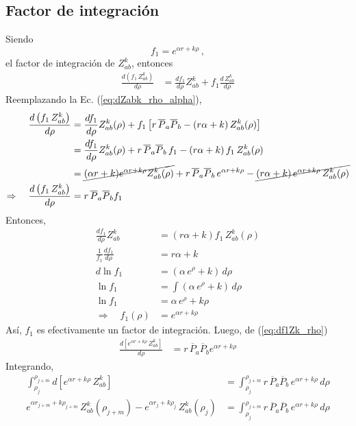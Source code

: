\documentclass[11pt]{article}
\begin{document}
\subsection{Factor de integración}
Siendo 
\begin{equation}
 f_1=e^{\alpha r+k\rho}\,,
\end{equation}
el factor de integración de $Z_{ab}^k$, entonces
\begin{align}
 \frac{d\left(f_1\,Z_{ab}^k\right)}{d\rho} 
 &=\frac{df_1}{d\rho} Z_{ab}^k + f_1 \frac{d\, Z_{ab}^k}{d\rho}
\end{align}
Reemplazando la Ec. (\ref{eq:dZabk_rho_alpha}),
\begin{align}
 \frac{d\left(f_1\,Z_{ab}^k\right)}{d\rho} 
 &=\frac{df_1}{d\rho} Z_{ab}^k(\rho) + f_1 \left[r\,\overline{P}_a\overline{P}_b - \left(r\alpha+k\right) Z_{ab}^k(\rho)\right]\\
 &=\frac{df_1}{d\rho} Z_{ab}^k(\rho) + r\,\overline{P}_a\overline{P}_b\,f_1 - \left(r\alpha+k\right)f_1\, Z_{ab}^k(\rho)\\
 &=\cancel{(\alpha r+k)e^{\alpha r+k\rho} Z_{ab}^k(\rho)} + r\,\overline{P}_a\overline{P}_b\,e^{\alpha r+k\rho} - \cancel{\left(r\alpha+k\right)e^{\alpha r+k\rho}\, Z_{ab}^k(\rho)} \\
 \Rightarrow\quad \frac{d\left(f_1\,Z_{ab}^k\right)}{d\rho} 
 &= r\,\overline{P}_a\overline{P}_b f_1 
 \label{eq:df1Zk_rho}
\end{align}
Entonces, 
\begin{align}
 \frac{df_1}{d\rho} Z_{ab}^k &= \left(r\alpha+k\right)f_1\, Z_{ab}^k(\rho) \\
 \frac{1}{f_1}\frac{df_1}{d\rho}&=r\alpha+k \\
 d \ln f_1 &=(\alpha\,e^{\rho} +k)\,d\rho \\
 \ln f_1 &=\int (\alpha\,e^{\rho}+k)\,d\rho \\
 \ln f_1 &=\alpha\,e^{\rho}+k\rho \\
 \Rightarrow\quad f_1(\rho)&=e^{\alpha r+k\rho}
\end{align}
Así, $f_1$ es efectivamente un factor de integración. Luego, de (\ref{eq:df1Zk_rho})
\begin{align}
 \frac{d\left[e^{\alpha r+k\rho}\,Z_{ab}^k\right]}{d\rho} &= r\,\overline{P}_a\overline{P}_b e^{\alpha r+k\rho} 
\end{align}
Integrando,
\begin{align}
 \int_{\rho_j}^{\rho_{j+m}} d\left[e^{\alpha r+k\rho}\,Z_{ab}^k\right] &= \int_{\rho_j}^{\rho_{j+m}} r\,\overline{P}_a\overline{P}_b\,e^{\alpha r+k\rho}\,d\rho \\
 e^{\alpha r_{j+m}+k\rho_{j+m}}\,Z_{ab}^k(\rho_{j+m}) - e^{\alpha r_j+k\rho_j}\,Z_{ab}^k(\rho_j)&= \int_{\rho_j}^{\rho_{j+m}} r\,\overline{P}_a\overline{P}_b\,e^{\alpha r+k\rho}\,d\rho 
\end{align}
\end{document}
